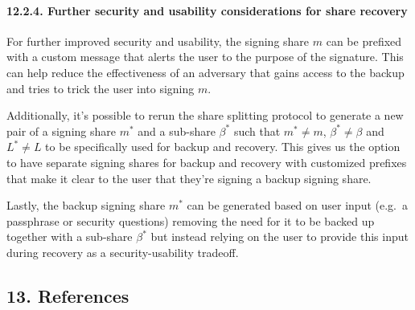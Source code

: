 \documentclass[
]{article}
\begin{document}
\hypertarget{share-recovery-backup-enhancements}{%
\paragraph{12.2.4. Further security and usability considerations for
share recovery}\label{share-recovery-backup-enhancements}}

For further improved security and usability, the signing share \(m\) can
be prefixed with a custom message that alerts the user to the purpose of
the signature. This can help reduce the effectiveness of an adversary
that gains access to the backup and tries to trick the user into signing
\(m\).

Additionally, it's possible to rerun the share splitting protocol to
generate a new pair of a signing share \(m^ \ast\) and a sub-share
\(\beta ^ \ast\) such that \(m^ \ast \neq m\),
\(\beta ^ \ast \neq \beta\) and \(L^ \ast \neq L\) to be specifically
used for backup and recovery. This gives us the option to have separate
signing shares for backup and recovery with customized prefixes that
make it clear to the user that they're signing a backup signing share.

Lastly, the backup signing share \(m^ \ast\) can be generated based on
user input (e.g.~a passphrase or security questions) removing the need
for it to be backed up together with a sub-share \(\beta ^ \ast\) but
instead relying on the user to provide this input during recovery as a
security-usability tradeoff.

\hypertarget{references}{%
\subsection{13. References}\label{references}}
\end{document}

